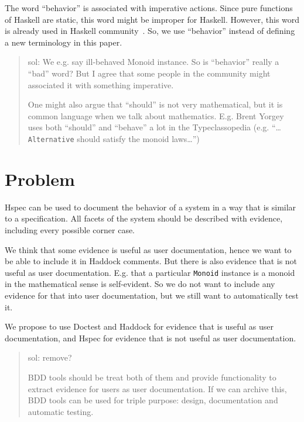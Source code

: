 \documentclass[preprint]{sigplanconf}
\begin{document}
The word ``behavior'' is associated with imperative actions.
Since pure functions of Haskell are static,
this word might be improper for Haskell.
However, this word is already used in Haskell community~\cite{typeclassopedia}.
So, we use ``behavior'' instead of defining a new terminology in this paper.

\begin{quote}
    sol: We e.g. say ill-behaved Monoid instance.  So is
    ``behavior'' really a ``bad'' word?  But I agree that some people in
    the community might associated it with something imperative.

    One might also argue that ``should'' is not very mathematical, but
    it is common language when we talk about mathematics.  E.g. Brent
    Yorgey uses both ``should'' and ``behave'' a lot in the
    Typeclassopedia (e.g. ``\ldots {\tt Alternative} should satisfy
    the monoid laws\ldots'')
\end{quote}

\section{Problem}

Hspec can be used to document the behavior of a system in a way that
is similar to a specification.  All facets of the system should be
described with evidence, including every possible corner case.

We think that some evidence is useful as user documentation, hence we
want to be able to include it in Haddock comments.  But there is also
evidence that is not useful as user documentation.  E.g. that a
particular \texttt{Monoid} instance is a monoid in the mathematical
sense is self-evident.  So we do not want to include any evidence for
that into user documentation, but we still want to automatically test
it.

We propose to use Doctest and Haddock for evidence that is useful as
user documentation, and Hspec for evidence that is not useful as user
documentation.

\begin{quote}
    sol: remove?

BDD tools should be treat both of them and provide functionality
to extract evidence for users as user documentation.
If we can archive this, BDD tools can be used for
triple purpose: design, documentation and automatic testing.
\end{quote}
\end{document}
